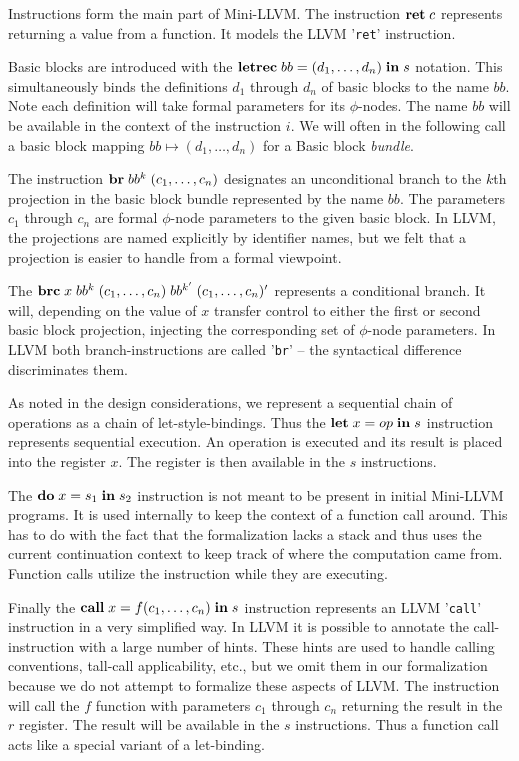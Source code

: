\documentclass[a4paper, oneside, 10pt, draft]{memoir}
\begin{document}
Instructions form the main part of Mini-LLVM. The instruction
$\mathbf{ret} \; c$ represents returning a value from a function. It models the
LLVM '\texttt{ret}' instruction.

Basic blocks are introduced with the $\mathbf{letrec} \; bb = (d_1, \dotsc,
  d_n) \; \mathbf{in} \; s$ notation. This simultaneously binds the definitions $d_1$
through $d_n$ of basic blocks to the name $bb$. Note each definition will
take formal parameters for its $\phi$-nodes. The name $bb$ will be
available in the context of the instruction $i$. We will often in the
following call a basic block mapping $bb \mapsto (d_1, \dotsc, d_n)$
for a Basic block \emph{bundle}.

The instruction $\mathbf{br} \; bb^k \; (c_1, \dotsc, c_n)$ designates an
unconditional branch to the $k$th projection in the basic block bundle
represented by the name $bb$. The parameters $c_1$ through $c_n$ are
formal $\phi$-node parameters to the given basic block. In LLVM, the
projections are named explicitly by identifier names, but we felt that
a projection is easier to handle from a formal viewpoint.

The $\mathbf{brc} \; x \; bb^k \; (c_1, \dotsc, c_n) \; bb^{k'} \; (c_1, \dotsc, c_n)'$ represents a conditional
branch. It will, depending on the value of $x$ transfer control to
either the first or second basic block projection, injecting the
corresponding set of $\phi$-node parameters. In LLVM both
branch-instructions are called '\texttt{br}' -- the syntactical
difference discriminates them.

As noted in the design considerations, we represent a sequential chain
of operations as a chain of let-style-bindings. Thus the
$\mathbf{let} \; x = op \; \mathbf{in} \; s$ instruction represents sequential execution. An
operation is executed and its result is placed into the register
$x$. The register is then available in the $s$ instructions.

The $\mathbf{do} \; x = s_1 \; \mathbf{in} \; s_2$ instruction is not meant to be present in
initial Mini-LLVM programs. It is used internally to keep the context
of a function call around. This has to do with the fact that the
formalization lacks a stack and thus uses the current continuation
context to keep track of where the computation came from. Function
calls utilize the instruction while they are executing.

Finally the $\mathbf{call} \; x = f (c_1, \dotsc, c_n)\; \mathbf{in} \; s$ instruction
represents an LLVM '\texttt{call}' instruction in a very simplified
way. In LLVM it is possible to annotate the call-instruction with a
large number of hints. These hints are used to handle calling
conventions, tall-call applicability, etc., but we omit them in our
formalization because we do not attempt to formalize these aspects of
LLVM. The instruction will call the $f$ function with parameters $c_1$
through $c_n$ returning the result in the $r$ register. The result
will be available in the $s$ instructions. Thus a function call acts
like a special variant of a let-binding.
\end{document}
